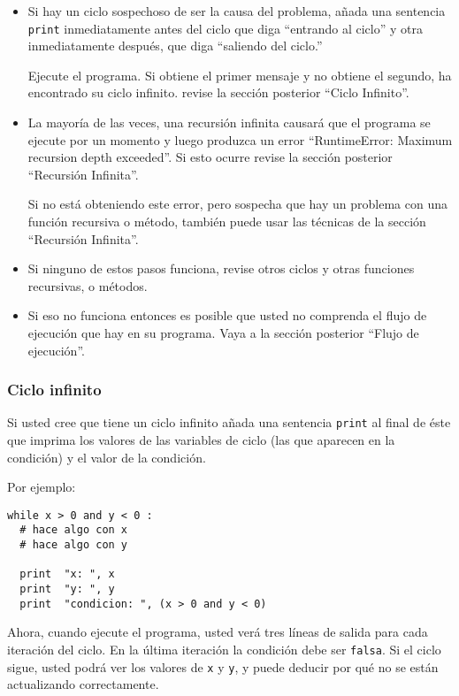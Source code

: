 \begin{itemize}

\item Si hay un ciclo sospechoso de ser la causa del problema,
añada una sentencia \texttt{print} inmediatamente antes 
del ciclo que diga ``entrando al ciclo'' y otra inmediatamente
después, que diga ``saliendo del ciclo.''

Ejecute el programa. Si obtiene el primer mensaje y no obtiene
el segundo, ha encontrado su ciclo infinito. revise la sección
posterior  ``Ciclo Infinito''.

\item La mayoría de las veces, una recursión infinita causará
que el programa se ejecute por un momento y luego produzca
un error ``RuntimeError: Maximum recursion depth exceeded''.  Si
esto ocurre revise la sección posterior ``Recursión Infinita''.

Si no está obteniendo este error, pero sospecha que hay un 
problema con una función recursiva o método, también puede usar las técnicas
de la sección ``Recursión Infinita''.

\item Si ninguno de estos pasos funciona, revise otros ciclos
y otras funciones recursivas, o métodos.

\item Si eso no funciona entonces es posible que usted no 
comprenda el flujo de ejecución que hay en su programa.
Vaya a la sección posterior  ``Flujo de ejecución''.

\end{itemize}


\subsubsection{Ciclo infinito}

Si usted cree que tiene un ciclo infinito añada una sentencia
 \texttt{print} al final de éste que imprima los valores de las 
variables de ciclo (las que aparecen en la condición) y 
el valor de la condición.

Por ejemplo:

\beforeverb
\begin{verbatim}
while x > 0 and y < 0 :
  # hace algo con x
  # hace algo con y

  print  "x: ", x
  print  "y: ", y
  print  "condicion: ", (x > 0 and y < 0)
\end{verbatim}
\afterverb
%
Ahora, cuando ejecute el programa, usted verá tres líneas
de salida para cada iteración del ciclo. En la última
iteración la condición debe ser \texttt{falsa}. Si el ciclo
sigue, usted podrá ver los valores de  \texttt{x} y \texttt{y},
y puede deducir por qué no se están actualizando correctamente.


